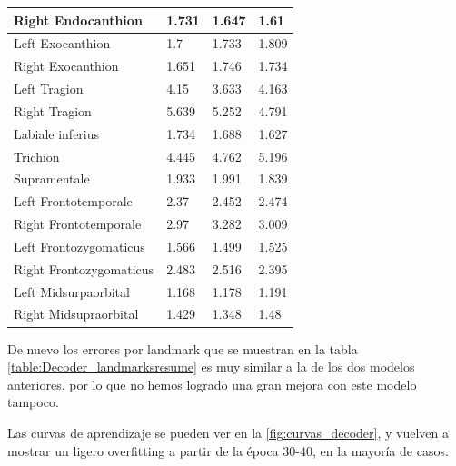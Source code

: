 \begin{table}[!ht]
\begin{tabular}{|l|l|l|l|}
                Right Endocanthion & 1.731 & 1.647 & \cellcolor{green!25}1.61 \\ \hline
                Left Exocanthion & \cellcolor{green!25}1.7 & 1.733 & 1.809 \\ \hline
                Right Exocanthion & \cellcolor{green!25}1.651 & 1.746 & 1.734 \\ \hline
                Left Tragion & 4.15 & \cellcolor{green!25}3.633 & 4.163 \\ \hline
                Right Tragion & 5.639 & 5.252 & \cellcolor{green!25}4.791 \\ \hline
                Labiale inferius & 1.734 & 1.688 & \cellcolor{green!25}1.627 \\ \hline
                Trichion & \cellcolor{green!25}4.445 & 4.762 & 5.196 \\ \hline
                Supramentale & 1.933 & 1.991 & \cellcolor{green!25}1.839 \\ \hline
                Left Frontotemporale & \cellcolor{green!25}2.37 & 2.452 & 2.474 \\ \hline
                Right Frontotemporale & \cellcolor{green!25}2.97 & 3.282 & 3.009 \\ \hline
                Left Frontozygomaticus & 1.566 & \cellcolor{green!25}1.499 & 1.525 \\ \hline
                Right Frontozygomaticus & 2.483 & 2.516 & \cellcolor{green!25}2.395 \\ \hline
                Left Midsurpaorbital & \cellcolor{green!25}1.168 & 1.178 & 1.191 \\ \hline
                Right Midsupraorbital & 1.429 & \cellcolor{green!25}1.348 & 1.48 \\ \hline
            \end{tabular}
            \label{table:Decoder_landmarksresume}
        \end{table}
        \medskip 

        \noindent De nuevo los errores por landmark que se muestran en la tabla \autoref{table:Decoder_landmarksresume} es muy similar a la de los dos modelos anteriores, por lo que no hemos logrado una gran mejora con este modelo tampoco.

        \medskip

        \noindent Las curvas de aprendizaje se pueden ver en la \autoref{fig:curvas_decoder}, y vuelven a mostrar un ligero overfitting a partir de la época $30$-$40$, en la mayoría de casos. 
        
